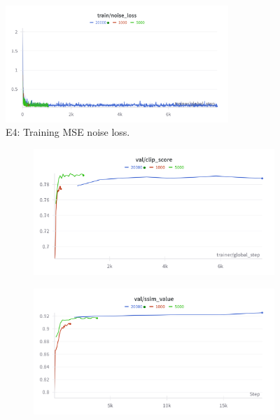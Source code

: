 \begin{figure}[htbp]
  \centering
  \includegraphics[width=0.75\textwidth]{images/experiments/data_scale/train_loss.png}
  \caption{E4: Training MSE noise loss.}
  \label{fig:exp_data_scale_train_loss}
\end{figure}

\begin{figure}[htbp]
  \centering
  \begin{subfigure}[b]{0.48\textwidth}
    \centering
    \includegraphics[width=\textwidth]{images/experiments/data_scale/clip_score.png}
    \label{fig:exp_data_scale_clip}
  \end{subfigure}
  \hfill
  \begin{subfigure}[b]{0.48\textwidth}
    \centering
    \includegraphics[width=\textwidth]{images/experiments/data_scale/ssim.png}
    \label{fig:exp_data_scale_ssim}
  \end{subfigure}


\end{figure}
